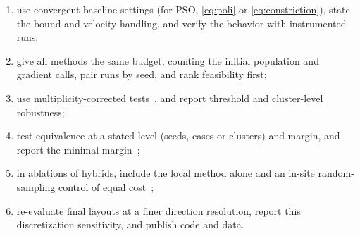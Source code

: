 \begin{enumerate}
\item use convergent baseline settings (for PSO, \eqref{eq:poli} or \eqref{eq:constriction}), state the bound and velocity handling, and verify the behavior with instrumented runs;
\item give all methods the same budget, counting the initial population and gradient calls, pair runs by seed, and rank feasibility first;
\item use multiplicity-corrected tests~\cite{Derrac2011}, and report threshold and cluster-level robustness;
\item test equivalence at a stated level (seeds, cases or clusters) and margin, and report the minimal margin~\cite{Lakens2017,Benavoli2017};
\item in ablations of hybrids, include the local method alone and an in-site random-sampling control of equal cost~\cite{Feng2015};
\item re-evaluate final layouts at a finer direction resolution, report this discretization sensitivity, and publish code and data.
\end{enumerate}

